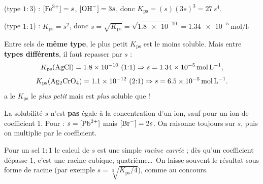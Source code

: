 \documentclass[11pt,a4paper]{article}
\begin{document}
\begin{exemplebox}
\textbf{} (type $1{:}3$) : $[\ce{Fe^{3+}}]=s$, $[\ce{OH-}]=3s$, donc
$K_{\mathrm{ps}}=(s)(3s)^{3}=27\,s^{4}$.

\smallskip
\textbf{} (type $1{:}1$) : $K_{\mathrm{ps}}=s^{2}$, donc
$s=\sqrt{K_{\mathrm{ps}}}=\sqrt{\num{1.8e-10}}=\qty{1.34e-5}{\mole\per\litre}$.
\end{exemplebox}

\begin{piege}
Entre sels de \textbf{même type}, le plus petit $K_{\mathrm{ps}}$ est le moins soluble. Mais entre
\textbf{types différents}, il faut repasser par $s$ :
\[ K_{\mathrm{ps}}(\ce{AgCl})=\num{1.8e-10}\ (1{:}1)\Rightarrow s=\qty{1.34e-5}{\mole\per\litre}, \]
\[ K_{\mathrm{ps}}(\ce{Ag2CrO4})=\num{1.1e-12}\ (2{:}1)\Rightarrow s=\qty{6.5e-5}{\mole\per\litre}. \]
 a le $K_{\mathrm{ps}}$ le \emph{plus petit} mais est \emph{plus} soluble que  !
\end{piege}

\begin{piege}
La solubilité $s$ n'est \textbf{pas} égale à la concentration d'un ion, sauf pour un ion de coefficient
$1$. Pour  : $s=[\ce{Pb^{2+}}]$ mais $[\ce{Br-}]=2s$. On raisonne toujours sur $s$, puis on
multiplie par le coefficient.
\end{piege}

\begin{remarque}
Pour un sel $1{:}1$ le calcul de $s$ est une simple \emph{racine carrée} ; dès qu'un coefficient dépasse
$1$, c'est une racine cubique, quatrième\dots\ On laisse souvent le résultat sous forme de racine
(par exemple $s=\sqrt[3]{K_{\mathrm{ps}}/4}$), comme au concours.
\end{remarque}
\end{document}

